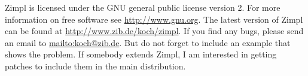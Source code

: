 \documentclass[12pt]{article}
\newcommand{\zimpl}{{\sc Zimpl}\xspace}
\begin{document}
\bigskip
\zimpl is licensed under the GNU general public license version 2.
For more information on free software see \url{http://www.gnu.org}.
The latest version of \zimpl can be found at
\url{http://www.zib.de/koch/zimpl}.
If you find any bugs, please send an email to
\url{mailto:koch@zib.de}. 
But do not forget to 
include an example that shows the problem.
If somebody extends \zimpl, I am interested in getting patches
to include them in the main distribution.

\nocite{*}
\small



{\vfill\tiny\hfill\fbox{\rcsInfoRevision}}
\end{document}
